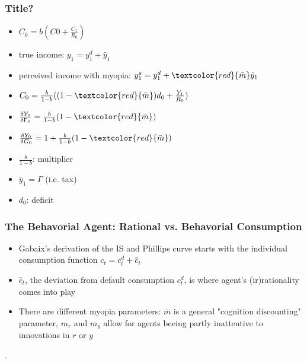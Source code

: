 \documentclass{beamer}
\begin{document}
\begin{frame}
\frametitle{Title?}
\begin{itemize}
\item $C_{0}=b(C{0}+\frac {C_{1}}{R_{0}})$
\item true income: $y_{1}=y_{1}^{d}+\hat y_{1}$
\item perceived income with myopia: $y_{1}^{s}=y_{1}^{d}+\textcolor{red}{\bar m}\hat y_{1}$
\item $C_{0}=\frac {b}{1-b}((1- \textcolor{red}{\bar m})d_{0}+\frac {Y_{1}}{R_{0}})$
\item $\frac{\delta Y_{0}}{\delta \Gamma_{0}}=\frac{b}{1-b}(1-\textcolor{red}{\bar m})$
\item $\frac{\delta Y_{0}}{\delta G_{0}}=1+\frac{b}{1-b}(1-\textcolor{red}{\bar m})$
\item $\frac{b}{1-b}$: multiplier
\item $\hat y_{1}=\Gamma$ (i.e. tax)
\item $d_{0}$: deficit
\end{itemize}

\end{frame}


\begin{frame}
\frametitle{The Behavorial Agent: Rational vs. Behavorial Consumption}
\begin{itemize}
\item Gabaix's derivation of the IS and Phillips curve starts with the individual consumption function $c_{t}=c_{t}^{d}+\hat c_{t}$
\item  $\hat c_{t}$, the deviation from default consumption $c_{t}^{d}$, is where agent's (ir)rationality comes into play
\item There are different myopia parameters: $\bar m$ is a general "cognition discounting" parameter, $m_{r}$ and $m_{y}$ allow for agents beeing partly inattentive to innovations in $r$ or $y$

\end{itemize}.

\end{frame}

\end{document}

